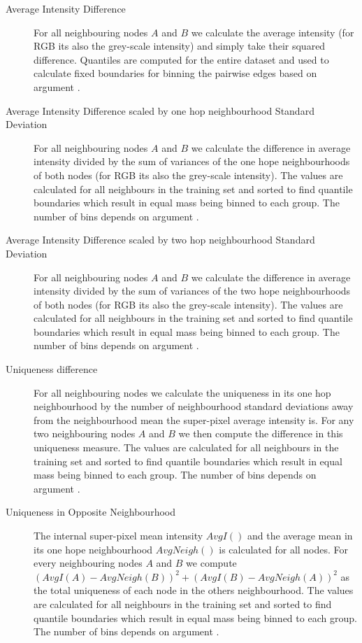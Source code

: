\begin{description}
\item[Average Intensity Difference] For all neighbouring nodes $A$ and $B$ we calculate the average intensity (for RGB its also the grey-scale intensity) and simply take their squared difference. Quantiles are computed for the entire dataset and used to calculate fixed boundaries for binning the pairwise edges based on argument . 
\item[ Average Intensity Difference scaled by one hop neighbourhood Standard Deviation ] For all neighbouring nodes $A$ and $B$ we calculate the difference in average intensity divided by the sum of variances of the one hope neighbourhoods of both nodes (for RGB its also the grey-scale intensity). The values are calculated for all neighbours in the training set and sorted to find quantile boundaries which result in equal mass being binned to each group. The number of bins depends on argument . 
\item[ Average Intensity Difference scaled by two hop neighbourhood Standard Deviation ] For all neighbouring nodes $A$ and $B$ we calculate the difference in average intensity divided by the sum of variances of the two hope neighbourhoods of both nodes (for RGB its also the grey-scale intensity). The values are calculated for all neighbours in the training set and sorted to find quantile boundaries which result in equal mass being binned to each group. The number of bins depends on argument . 
\item[ Uniqueness difference ] For all neighbouring nodes we calculate the uniqueness in its one hop neighbourhood by the number of neighbourhood standard deviations away from the neighbourhood mean the super-pixel average intensity is. For any two neighbouring nodes $A$ and $B$ we then compute the difference in this uniqueness measure. The values are calculated for all neighbours in the training set and sorted to find quantile boundaries which result in equal mass being binned to each group. The number of bins depends on argument . 
\item[ Uniqueness in Opposite Neighbourhood ]  The internal super-pixel mean intensity $AvgI()$ and the average mean in its one hope neighbourhood $AvgNeigh()$ is calculated for all nodes. For every neighbouring nodes $A$ and $B$ we compute $(AvgI(A) - AvgNeigh(B))^2 + (AvgI(B) - AvgNeigh(A))^2$ as the total uniqueness of each node in the others neighbourhood. The values are calculated for all neighbours in the training set and sorted to find quantile boundaries which result in equal mass being binned to each group. The number of bins depends on argument . 

\end{description}

